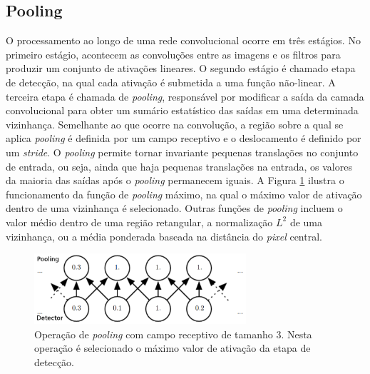 \subsection{Pooling}
O processamento ao longo de uma rede convolucional ocorre em três estágios. No primeiro estágio,
acontecem as convoluções entre as imagens e os filtros para produzir um conjunto de ativações lineares.
O segundo estágio é chamado etapa de detecção, na qual cada ativação é submetida a uma
função não-linear. A terceira etapa é chamada de \textit{pooling}, responsável por
modificar a saída da camada convolucional para obter um sumário estatístico das saídas em uma determinada vizinhança.
Semelhante ao que ocorre na convolução, a região sobre a qual se aplica \textit{pooling} é definida por um
campo receptivo e o deslocamento é definido por um \textit{stride}. O \textit{pooling} permite tornar
invariante pequenas translações no conjunto de entrada, ou seja, ainda que haja pequenas translações na
entrada, os valores da maioria das saídas após o \textit{pooling} permanecem iguais.
A Figura \ref{fig:pool} ilustra o funcionamento da função de \textit{pooling} máximo, na qual
o máximo valor de ativação dentro de uma vizinhança é selecionado. Outras funções de \textit{pooling} incluem o valor médio
dentro de uma região retangular, a normalização $L^2$ de uma vizinhança, ou a média ponderada baseada na distância do \textit{pixel} central.
\begin{figure}[htp]
\begin{center}
  \includegraphics[width=0.7\textwidth]{fig/pool}
  \caption{Operação de \textit{pooling} com campo receptivo de tamanho 3. Nesta operação é selecionado o máximo valor de ativação da etapa de detecção.}
  \label{fig:pool}
\end{center}
\end{figure}

